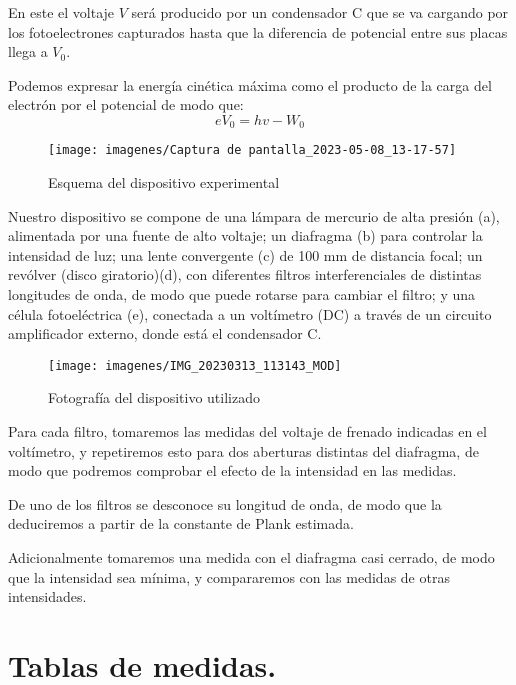\documentclass[a4paper,12pt,spanish]{article}
\begin{document}
	En este el voltaje $V$ será producido por un condensador C que se va cargando por los fotoelectrones capturados hasta que la diferencia de potencial entre sus placas llega a $V_0$. 
	
	Podemos expresar la energía cinética máxima como el producto de la carga del electrón por el potencial de modo que:
	\[ eV_0 = hv - W_0
	\]
	
	
\begin{figure}[H]
	\centering
	\texttt{[image: imagenes/Captura de pantalla\_2023-05-08\_13-17-57]}
	\caption{Esquema del dispositivo experimental}
	\label{fig:esquema}
\end{figure}
	
	
	Nuestro dispositivo se compone de una lámpara de mercurio de alta presión (a), alimentada por una fuente de alto voltaje; un diafragma (b) para controlar la intensidad de luz; una lente convergente (c) de 100 mm de distancia focal; un revólver (disco giratorio)(d), con diferentes filtros interferenciales de distintas longitudes de onda, de modo que puede rotarse para cambiar el filtro; y una célula fotoeléctrica (e), conectada a un voltímetro (DC) a través de un circuito amplificador externo, donde está el condensador C.
	
	
\begin{figure}[H]
	\centering
	\texttt{[image: imagenes/IMG\_20230313\_113143\_MOD]}
	\caption{Fotografía del dispositivo utilizado}
	\label{fig:img20230313113143}
\end{figure}
	
	
	Para cada filtro, tomaremos las medidas del voltaje de frenado indicadas en el voltímetro, y repetiremos esto para dos aberturas distintas del diafragma, de modo que podremos comprobar el efecto de la intensidad en las medidas.
	
	De uno de los filtros se desconoce su longitud de onda, de modo que la deduciremos a partir de la constante de Plank estimada.
	
	Adicionalmente tomaremos una medida con el diafragma casi cerrado, de modo que la intensidad sea mínima, y compararemos con las medidas de otras intensidades.
	
	
	
	
	
	
	
	\section{Tablas de medidas.}
	
\end{document}
